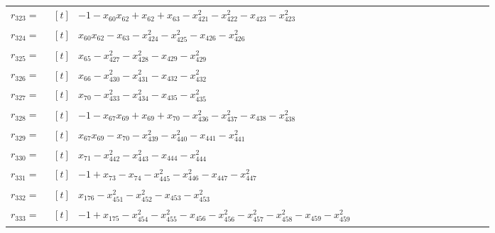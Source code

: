 \begin{longtable}{@{}r p{0.92\linewidth}@{}}
$r_{323}=$ & $\begin{aligned}[t]&-1-x_{60}x_{62}+x_{62}+x_{63}-x_{421}^{2}-x_{422}^{2}-x_{423}-x_{423}^{2}\end{aligned}$ \\[2pt]
$r_{324}=$ & $\begin{aligned}[t]&x_{60}x_{62}-x_{63}-x_{424}^{2}-x_{425}^{2}-x_{426}-x_{426}^{2}\end{aligned}$ \\[2pt]
$r_{325}=$ & $\begin{aligned}[t]&x_{65}-x_{427}^{2}-x_{428}^{2}-x_{429}-x_{429}^{2}\end{aligned}$ \\[2pt]
$r_{326}=$ & $\begin{aligned}[t]&x_{66}-x_{430}^{2}-x_{431}^{2}-x_{432}-x_{432}^{2}\end{aligned}$ \\[2pt]
$r_{327}=$ & $\begin{aligned}[t]&x_{70}-x_{433}^{2}-x_{434}^{2}-x_{435}-x_{435}^{2}\end{aligned}$ \\[2pt]
$r_{328}=$ & $\begin{aligned}[t]&-1-x_{67}x_{69}+x_{69}+x_{70}-x_{436}^{2}-x_{437}^{2}-x_{438}-x_{438}^{2}\end{aligned}$ \\[2pt]
$r_{329}=$ & $\begin{aligned}[t]&x_{67}x_{69}-x_{70}-x_{439}^{2}-x_{440}^{2}-x_{441}-x_{441}^{2}\end{aligned}$ \\[2pt]
$r_{330}=$ & $\begin{aligned}[t]&x_{71}-x_{442}^{2}-x_{443}^{2}-x_{444}-x_{444}^{2}\end{aligned}$ \\[2pt]
$r_{331}=$ & $\begin{aligned}[t]&-1+x_{73}-x_{74}-x_{445}^{2}-x_{446}^{2}-x_{447}-x_{447}^{2}\end{aligned}$ \\[2pt]
$r_{332}=$ & $\begin{aligned}[t]&x_{176}-x_{451}^{2}-x_{452}^{2}-x_{453}-x_{453}^{2}\end{aligned}$ \\[2pt]
$r_{333}=$ & $\begin{aligned}[t]&-1+x_{175}-x_{454}^{2}-x_{455}^{2}-x_{456}-x_{456}^{2}-x_{457}^{2}-x_{458}^{2}-x_{459}-x_{459}^{2}\end{aligned}$ \\[2pt]

\end{longtable}
